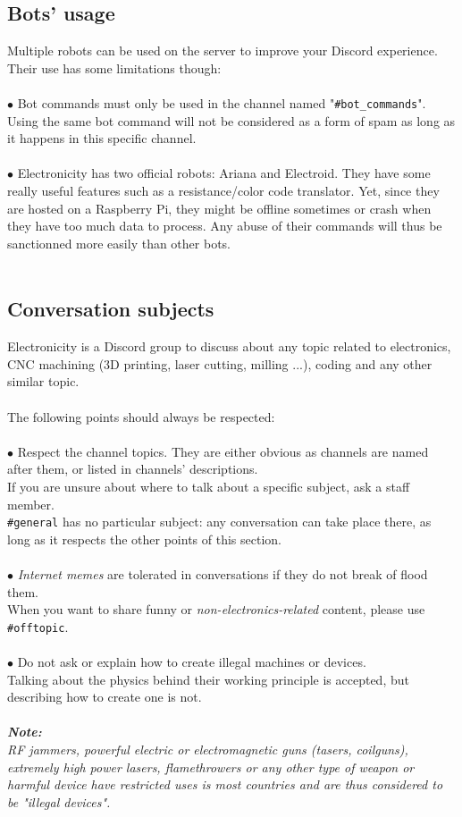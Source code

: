 \documentclass[a4paper]{article}
\begin{document}
\subsection{Bots' usage}
Multiple robots can be used on the server to improve your Discord experience. Their use has some limitations though:\\\\
$\bullet$ Bot commands must only be used in the channel named "\texttt{\#bot\_commands}". Using the same bot command will not be considered as a form of spam as long as it happens in this specific channel.\\\\
$\bullet$ Electronicity has two official robots: Ariana and Electroid. They have some really useful features such as a resistance/color code translator. Yet, since they are hosted on a Raspberry Pi, they might be offline sometimes or crash when they have too much data to process. Any abuse of their commands will thus be sanctionned more easily than other bots.\\\\
\subsection{Conversation subjects}
Electronicity is a Discord group to discuss about any topic related to electronics, CNC machining (3D printing, laser cutting, milling ...), coding and any other similar topic.\\\\
The following points should always be respected:\\\\
$\bullet$ Respect the channel topics. They are either obvious as channels are named after them, or listed in channels' descriptions.\\
If you are unsure about where to talk about a specific subject, ask a staff member.\\
\texttt{\#general} has no particular subject: any conversation can take place there, as long as it respects the other points of this section.\\\\
$\bullet$ \textsl{Internet memes} are tolerated in conversations if they do not break of flood them.\\
When you want to share funny or \textsl{non-electronics-related} content, please use \texttt{\#offtopic}.\\\\
$\bullet$ Do not ask or explain how to create illegal machines or devices.\\ Talking about the physics behind their working principle is accepted, but describing how to create one is not.\\\\
\textsl{{\small \textbf{Note:}\\
RF jammers, powerful electric or electromagnetic guns (tasers, coilguns), extremely high power lasers, flamethrowers or any other type of weapon or harmful device have restricted uses is most countries and are thus considered to be "illegal devices".}}
\end{document}
